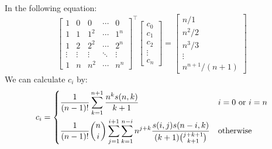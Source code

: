 \documentclass{book}
\begin{document}
\pagebreak
In the following equation:
\begin{equation}
    \begin{bmatrix}
        1&0&0&\cdots&0 \\
        1&1&1^2&\cdots&1^n \\
        1&2&2^2&\cdots&2^n \\
        \vdots&\vdots & \vdots & \ddots & \vdots\\
        1&n&n^2&\cdots&n^n
    \end{bmatrix}^\top
    \begin{bmatrix}
        c_0 \\
        c_1 \\
        c_2 \\
        \vdots \\
        c_n
    \end{bmatrix}
    =
    \begin{bmatrix}
        n/1\\
        n^2/2\\
        n^3/3\\
        \vdots \\
        n^{n+1}/(n+1)
    \end{bmatrix} \nonumber
\end{equation}
We can calculate $c_i$ by:
\begin{equation}
    c_i =
    \begin{dcases}
        \frac{1}{(n-1)!}\sum\limits_{k=1}^{n+1} \frac{n^k s(n, k)}{k+1} & i = 0 \text{ or } i=n\\
        \frac{1}{(n-1)!}\binom{n}{i}\sum\limits_{j=1}^{i+1} \sum\limits_{k=1}^{n-i} n^{j+k} \frac{s(i, j)s(n-i, k)}{(k+1)\binom{j+k+1}{k+1}} & \text{otherwise}
    \end{dcases}\nonumber
\end{equation}
\end{document}
